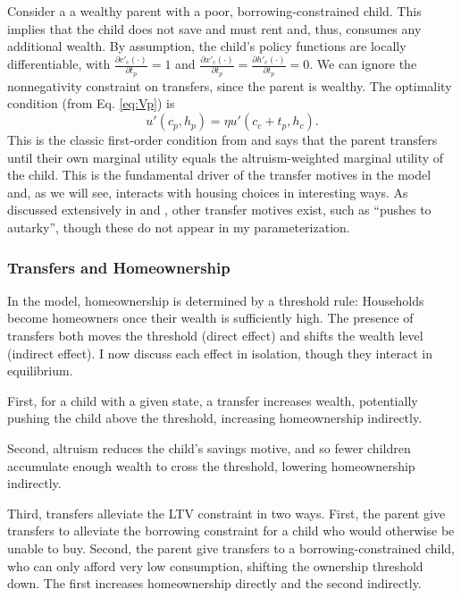 \documentclass[12pt]{article}
\begin{document}
Consider a a wealthy parent with a poor, borrowing-constrained child. This implies that the child does not save and must rent and, thus, consumes any additional wealth. By assumption, the child's policy functions are locally differentiable, with $\frac{\partial c'_c(\cdot)}{\partial t_p}=1$ and $\frac{\partial x'_c(\cdot)}{\partial t_p}=\frac{\partial h'_c(\cdot)}{\partial t_p}=0$. We can ignore the nonnegativity constraint on transfers, since the parent is wealthy. The optimality condition (from Eq. \ref{eq:Vp}) is
\begin{equation}\label{eq:FOC}
	u'(c_p,h_p) = \eta u'(c_c + t_p,h_c).
\end{equation}
This is the classic first-order condition from \cite{Altonji1997a} and says that the parent transfers until their own marginal utility equals the altruism-weighted marginal utility of the child. This is the fundamental driver of the transfer motives in the model and, as we will see, interacts with housing choices in interesting ways. As discussed extensively in \cite{Barczyk2020a} and \cite{Chu2020}, other transfer motives exist, such as ``pushes to autarky'', though these do not appear in my parameterization.

\subsubsection{Transfers and Homeownership}
In the model, homeownership is determined by a threshold rule: Households become homeowners once their wealth is sufficiently high. The presence of transfers both moves the threshold (direct effect) and shifts the wealth level (indirect effect). I now discuss each effect in isolation, though they interact in equilibrium.

First, for a child with a given state, a transfer increases wealth, potentially pushing the child above the threshold, increasing homeownership indirectly.

Second, altruism reduces the child's savings motive, and so fewer children accumulate enough wealth to cross the threshold, lowering homeownership indirectly.

Third, transfers alleviate the LTV constraint in two ways. First, the parent give transfers to alleviate the borrowing constraint for a child who would otherwise be unable to buy. Second, the parent give transfers to a borrowing-constrained child, who can only afford very low consumption, shifting the ownership threshold down. The first increases homeownership directly and the second indirectly.
\end{document}
